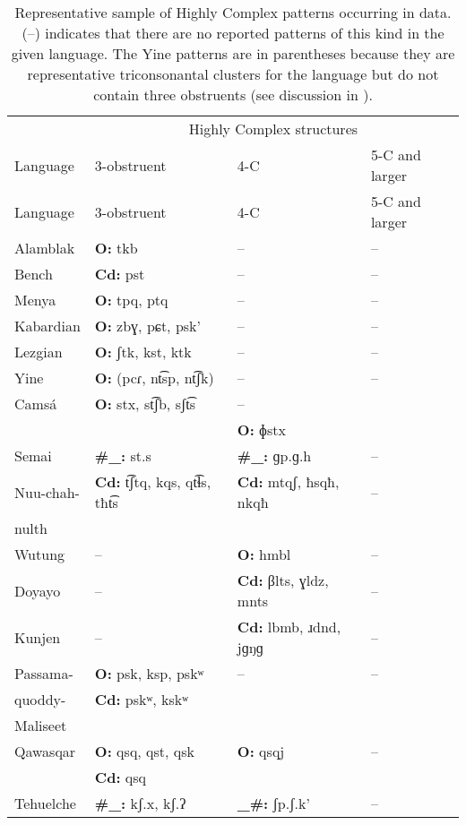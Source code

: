 {\footnotesize\begin{longtable}{llll}
\caption{\label{tab:3.12}Representative sample of Highly Complex patterns occurring in data. (--) indicates that there are no reported patterns of this kind in the given language. The Yine patterns are in parentheses because they are representative triconsonantal clusters for the language but do not contain three obstruents (see discussion in ).}\\
\lsptoprule  & \multicolumn{3}{c}{Highly Complex structures}\\\cmidrule(lr){2-4} {Language} & 3-obstruent & 4-C & 5-C and larger\\\midrule\endfirsthead\midrule Language & 3-obstruent & 4-C & 5-C and larger\\\midrule\endhead
\lspbottomrule\endlastfoot\endfoot
{Alamblak} & \textbf{O:} tkb & -- & --\\
{Bench} & \textbf{Cd:} pst & -- & --\\
{Menya} & \textbf{O:} tpq, ptq & -- & --\\
{Kabardian} & \textbf{O:} zbɣ, pɕt, psk’ & -- & --\\
{Lezgian} & \textbf{O:} ʃtk, kst, ktk & -- & --\\
{Yine} & \textbf{O:} (pcɾ, nt͡sp, nt͡ʃk) & -- & --\\
{Camsá} & \textbf{O:} stx, st͡ʃb, sʃt͡s & -- \\
        & & {\textbf{O:} ɸstx} & \\
{Semai} & \textbf{\#\_:} st.s & \textbf{\#\_:} ɡp.ɡ.h & --\\
{Nuu-chah-} & \textbf{Cd:} t͡ʃtq, kqs, qt͡ɬs, tħt͡s & \textbf{Cd:} mtqʃ, ħsqħ, nkqħ & --\\
nulth \\\tablevspace
{Wutung} & -- & \textbf{O:} hmbl & --\\
{Doyayo} & -- & \textbf{Cd:} βlts, ɣldz, mnts & --\\
{Kunjen} & -- & \textbf{Cd:} lbmb, ɹdnd, jɡŋɡ & --\\
{Passama-} & \textbf{O:} psk, ksp, pskʷ & -- & --\\
quoddy-  &  \textbf{Cd:} pskʷ, kskʷ  \\
Maliseet \\\tablevspace
{Qawasqar} & \textbf{O:} qsq, qst, qsk & \textbf{O:} qsqj & --\\
           & \textbf{Cd:} qsq  \\
{Tehuelche} & \textbf{\#\_:} kʃ.x, kʃ.ʔ  & \textbf{\_\#:} ʃp.ʃ.k’ & --\\

\end{longtable}}
